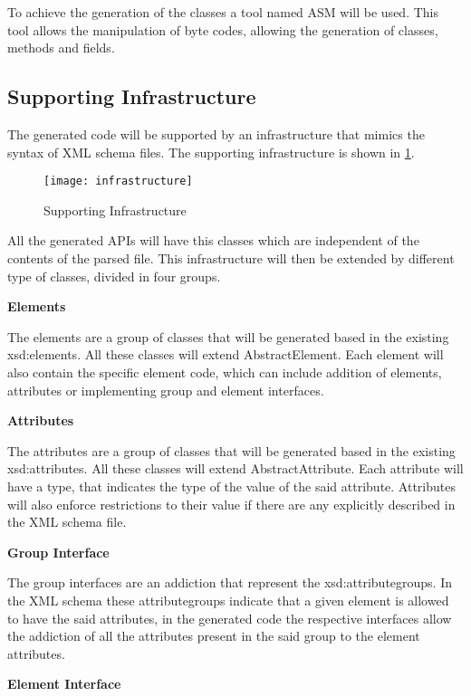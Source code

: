 \noindent
To achieve the generation of the classes a tool named ASM will be used. This tool allows the manipulation of byte codes, allowing the generation of classes, methods and fields. 

\newpage

\subsection{Supporting Infrastructure}

The generated code will be supported by an infrastructure that mimics the syntax of XML schema files. The supporting infrastructure is shown in \ref{Infrastructure}.

\begin{figure}[h]
	\centering
	\texttt{[image: infrastructure]}
	\caption{Supporting Infrastructure}
	\label{Infrastructure}
\end{figure}

\noindent
All the generated APIs will have this classes which are independent of the contents of the parsed file. This infrastructure will then be extended by different type of classes, divided in four groups.

\textbf{Elements}

The elements are a group of classes that will be generated based in the existing xsd:elements. All these classes will extend AbstractElement. Each element will also contain the specific element code, which can include addition of elements, attributes or implementing group and element interfaces.

\textbf{Attributes}

The attributes are a group of classes that will be generated based in the existing xsd:attributes. All these classes will extend AbstractAttribute. Each attribute will have a type, that indicates the type of the value of the said attribute. Attributes will also enforce restrictions to their value if there are any explicitly described in the XML schema file.

\textbf{Group Interface}

The group interfaces are an addiction that represent the xsd:attributegroups. In the XML schema these attributegroups indicate that a given element is allowed to have the said attributes, in the generated code the respective interfaces allow the addiction of all the attributes present in the said group to the element attributes.

\textbf{Element Interface}

